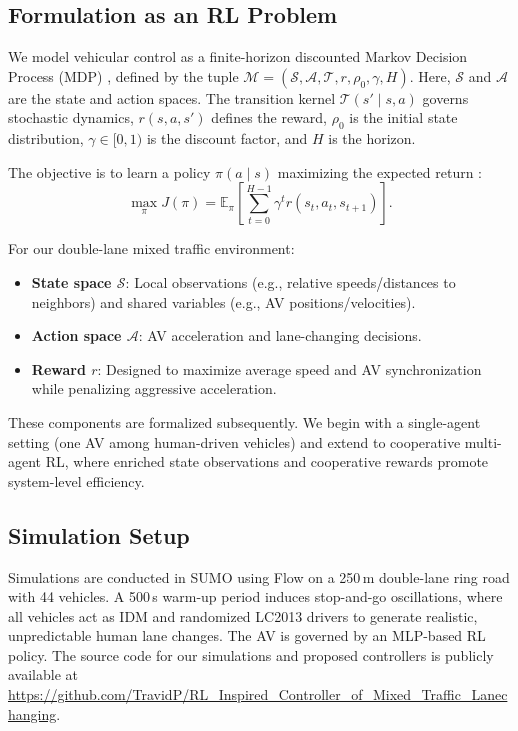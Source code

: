\documentclass{ifacconf}
\begin{document}
\subsection{Formulation as an RL Problem}
\label{subsec:rl_formulation}

We model vehicular control as a finite-horizon discounted Markov Decision Process (MDP) \citep{puterman2014markov}, defined by the tuple $\mathcal{M} = (\mathcal{S}, \mathcal{A}, \mathcal{T}, r, \rho_0, \gamma, H)$. Here, $\mathcal{S}$ and $\mathcal{A}$ are the state and action spaces. The transition kernel $\mathcal{T}(s' \mid s, a)$ governs stochastic dynamics, $r(s, a, s')$ defines the reward, $\rho_0$ is the initial state distribution, $\gamma \in [0,1)$ is the discount factor, and $H$ is the horizon. 

The objective is to learn a policy $\pi(a \mid s)$ maximizing the expected return \citep{sutton1998reinforcement}:
\begin{equation*}
\max_{\pi} J(\pi) = \mathbb{E}_{\pi} \left[ \sum_{t=0}^{H-1} \gamma^t r(s_t, a_t, s_{t+1}) \right].
\label{eq:mdp_objective}
\end{equation*}

For our double-lane mixed traffic environment:
\begin{itemize}
    \item \textbf{State space $\mathcal{S}$}: Local observations (e.g., relative speeds/distances to neighbors) and shared variables (e.g., AV positions/velocities).
    \item \textbf{Action space $\mathcal{A}$}: AV acceleration and lane-changing decisions.
    \item \textbf{Reward $r$}: Designed to maximize average speed and AV synchronization while penalizing aggressive acceleration.
\end{itemize}

These components are formalized subsequently. We begin with a single-agent setting (one AV among human-driven vehicles) and extend to cooperative multi-agent RL, where enriched state observations and cooperative rewards promote system-level efficiency. 


\subsection{Simulation Setup}
Simulations are conducted in SUMO using Flow \citep{wu2017flow} on a 250\,m double-lane ring road with 44 vehicles. A 500\,s warm-up period induces stop-and-go oscillations, where all vehicles act as IDM \citep{treiber2000congested} and randomized LC2013 \citep{erdmann2015sumo} drivers to generate realistic, unpredictable human lane changes. The AV is governed by an MLP-based RL policy. The source code for our simulations and proposed controllers is publicly available at \url{https://github.com/TravidP/RL_Inspired_Controller_of_Mixed_Traffic_Lanechanging}. 
 
\end{document}
